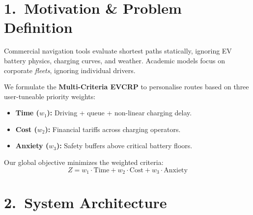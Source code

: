 \documentclass[a0,portrait]{a0poster}
\begin{document}
\noindent\begin{minipage}[t][83cm]{0.31\linewidth}

\section*{1.\ Motivation \& Problem Definition}
\normalsize
Commercial navigation tools evaluate shortest paths statically, ignoring EV
battery physics, charging curves, and weather.  Academic models focus on
corporate \emph{fleets}, ignoring individual drivers.

We formulate the \textbf{Multi-Criteria EVCRP} to personalise routes based on
three user-tuneable priority weights:

\begin{itemize}[leftmargin=1.4em,itemsep=2pt]
  \item \textbf{Time ($w_1$):}    Driving + queue + non-linear charging delay.
  \item \textbf{Cost ($w_2$):}    Financial tariffs across charging operators.
  \item \textbf{Anxiety ($w_3$):} Safety buffers above critical battery floors.
\end{itemize}

\vspace{0.4cm}
Our global objective minimizes the weighted criteria:
\[
  Z = w_1 \cdot \text{Time} + w_2 \cdot \text{Cost} + w_3 \cdot \text{Anxiety}
\]

\section*{2.\ System Architecture}

\begin{center}
\end{center}
\end{minipage}
\end{document}
